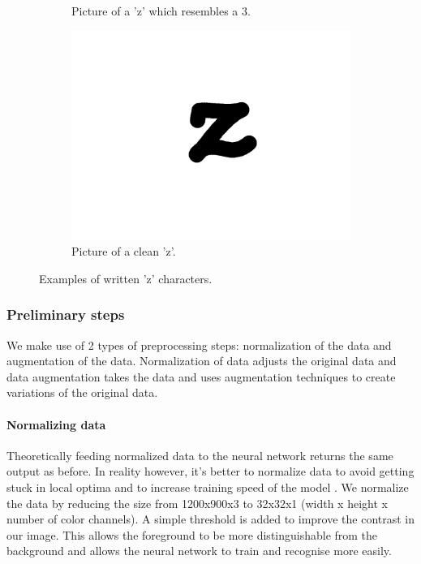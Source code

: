 \documentclass{article}
\begin{document}
\begin{figure}
\begin{subfigure}{.15\textwidth}
  \caption{Picture of a 'z' which resembles a 3.}
\end{subfigure}
\begin{subfigure}{0.15\textwidth}
  \centering
  \includegraphics[width=\linewidth]{images/good_char}
  \caption{Picture of a clean 'z'.}
\end{subfigure}
\caption{Examples of written 'z' characters.}
\label{fig:char}
\end{figure}


\subsubsection{Preliminary steps}
\label{sec:preproc}
We make use of 2 types of preprocessing steps: normalization of the data and augmentation of the data. Normalization of data adjusts the original data and data augmentation takes the data and uses augmentation techniques to create variations of the original data.

\paragraph{Normalizing data} 
\label{par:norm}
Theoretically feeding normalized data to the neural network returns the same output as before. 
In reality however, it's better to normalize data to avoid getting stuck in local optima and to increase training speed of the model \cite{NormGoal}. We normalize the data by reducing the size from 1200x900x3 to 32x32x1 (width x height x number of color channels). A simple threshold is added to improve the contrast in our image. This allows the foreground to be more distinguishable from the background and allows the neural network to train and recognise more easily. 
\end{document}
